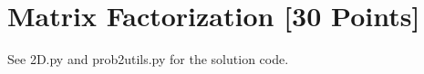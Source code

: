 \newpage
\problem[4] 

\begin{solution}

\end{solution}

\newpage
\problem[4] 
\begin{solution}
\end{solution}

\newpage
\problem[2] 
\begin{solution}

\end{solution}


\newpage
\section{Matrix Factorization [30 Points]}

\problem[5]

\begin{solution}

\end{solution}

\newpage
\problem[5]

\begin{solution}

\end{solution}

\newpage
\problem[10]

\begin{solution}
See 2D.py and prob2utils.py for the solution code.
\end{solution}

\newpage
\problem[5]

\begin{solution}

%


\end{solution}

\newpage
\problem[5]

